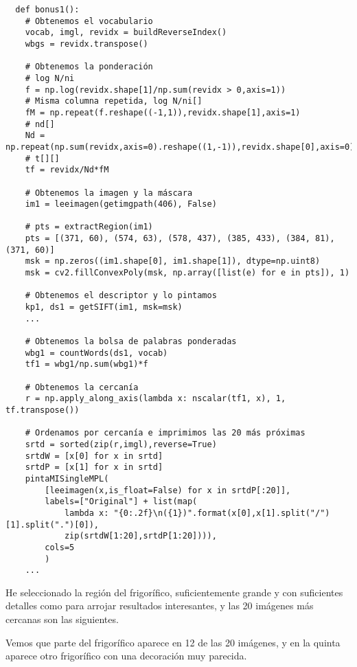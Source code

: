 \documentclass{article}
\newcommand{\img}[2]{
\noindent\makebox[\textwidth][c]{\texttt{[image: imgs/\#1]}}%
}
\begin{document}
\begin{verbatim}
  def bonus1():
    # Obtenemos el vocabulario
    vocab, imgl, revidx = buildReverseIndex()
    wbgs = revidx.transpose()

    # Obtenemos la ponderación
    # log N/ni
    f = np.log(revidx.shape[1]/np.sum(revidx > 0,axis=1)) 
    # Misma columna repetida, log N/ni[]
    fM = np.repeat(f.reshape((-1,1)),revidx.shape[1],axis=1) 
    # nd[]
    Nd = np.repeat(np.sum(revidx,axis=0).reshape((1,-1)),revidx.shape[0],axis=0)
    # t[][]
    tf = revidx/Nd*fM
    
    # Obtenemos la imagen y la máscara
    im1 = leeimagen(getimgpath(406), False)

    # pts = extractRegion(im1)
    pts = [(371, 60), (574, 63), (578, 437), (385, 433), (384, 81), (371, 60)]
    msk = np.zeros((im1.shape[0], im1.shape[1]), dtype=np.uint8)
    msk = cv2.fillConvexPoly(msk, np.array([list(e) for e in pts]), 1)

    # Obtenemos el descriptor y lo pintamos
    kp1, ds1 = getSIFT(im1, msk=msk)
    ...

    # Obtenemos la bolsa de palabras ponderadas
    wbg1 = countWords(ds1, vocab)
    tf1 = wbg1/np.sum(wbg1)*f

    # Obtenemos la cercanía
    r = np.apply_along_axis(lambda x: nscalar(tf1, x), 1, tf.transpose())

    # Ordenamos por cercanía e imprimimos las 20 más próximas
    srtd = sorted(zip(r,imgl),reverse=True)
    srtdW = [x[0] for x in srtd]
    srtdP = [x[1] for x in srtd]
    pintaMISingleMPL(
        [leeimagen(x,is_float=False) for x in srtdP[:20]],
        labels=["Original"] + list(map(
            lambda x: "{0:.2f}\n({1})".format(x[0],x[1].split("/")[1].split(".")[0]),
            zip(srtdW[1:20],srtdP[1:20]))),
        cols=5
        )
    ...
\end{verbatim}

\img{b1_0}{0.8}

He seleccionado la región del frigorífico, suficientemente grande y con suficientes detalles como para arrojar resultados interesantes, y las 20 imágenes más cercanas son las siguientes.

\img{b1_1}{0.8}

Vemos que parte del frigorífico aparece en 12 de las 20 imágenes, y en la quinta aparece otro frigorífico con una decoración muy parecida.
\end{document}
